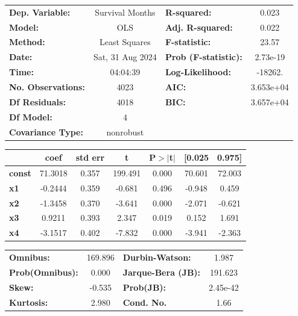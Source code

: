 \documentclass[11pt]{article}
\newcommand{\prompt}[4]{
        {\ttfamily\llap{{\color{#2}[#3]:\hspace{3pt}#4}}\vspace{-\baselineskip}}
    }
\begin{document}
            
\prompt{Out}{outcolor}{12}{}
    
    \begin{center}
\begin{tabular}{lclc}
\toprule
\textbf{Dep. Variable:}    & Survival Months  & \textbf{  R-squared:         } &     0.023   \\
\textbf{Model:}            &       OLS        & \textbf{  Adj. R-squared:    } &     0.022   \\
\textbf{Method:}           &  Least Squares   & \textbf{  F-statistic:       } &     23.57   \\
\textbf{Date:}             & Sat, 31 Aug 2024 & \textbf{  Prob (F-statistic):} &  2.73e-19   \\
\textbf{Time:}             &     04:04:39     & \textbf{  Log-Likelihood:    } &   -18262.   \\
\textbf{No. Observations:} &        4023      & \textbf{  AIC:               } & 3.653e+04   \\
\textbf{Df Residuals:}     &        4018      & \textbf{  BIC:               } & 3.657e+04   \\
\textbf{Df Model:}         &           4      & \textbf{                     } &             \\
\textbf{Covariance Type:}  &    nonrobust     & \textbf{                     } &             \\
\bottomrule
\end{tabular}
\begin{tabular}{lcccccc}
               & \textbf{coef} & \textbf{std err} & \textbf{t} & \textbf{P$> |$t$|$} & \textbf{[0.025} & \textbf{0.975]}  \\
\midrule
\textbf{const} &      71.3018  &        0.357     &   199.491  &         0.000        &       70.601    &       72.003     \\
\textbf{x1}    &      -0.2444  &        0.359     &    -0.681  &         0.496        &       -0.948    &        0.459     \\
\textbf{x2}    &      -1.3458  &        0.370     &    -3.641  &         0.000        &       -2.071    &       -0.621     \\
\textbf{x3}    &       0.9211  &        0.393     &     2.347  &         0.019        &        0.152    &        1.691     \\
\textbf{x4}    &      -3.1517  &        0.402     &    -7.832  &         0.000        &       -3.941    &       -2.363     \\
\bottomrule
\end{tabular}
\begin{tabular}{lclc}
\textbf{Omnibus:}       & 169.896 & \textbf{  Durbin-Watson:     } &    1.987  \\
\textbf{Prob(Omnibus):} &   0.000 & \textbf{  Jarque-Bera (JB):  } &  191.623  \\
\textbf{Skew:}          &  -0.535 & \textbf{  Prob(JB):          } & 2.45e-42  \\
\textbf{Kurtosis:}      &   2.980 & \textbf{  Cond. No.          } &     1.66  \\
\bottomrule
\end{tabular}
\end{center}
\end{document}

